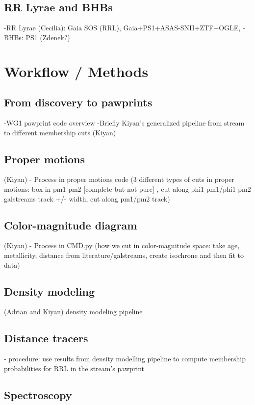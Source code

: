 \documentclass[twocolumn]{aastex63}
\begin{document}
\subsection{RR Lyrae and BHBs}

-RR Lyrae (Cecilia): Gaia SOS (RRL), Gaia+PS1+ASAS-SNII+ZTF+OGLE,  
-BHBs: PS1 (Zdenek?)

\section{Workflow / Methods}

\subsection{From discovery to pawprints}

-WG1 pawprint code overview
-Briefly Kiyan's generalized pipeline from stream to different membership cuts (Kiyan)

\subsection{Proper motions}
(Kiyan)
- Process in proper motions code (3 different types of cuts in proper motions: box in pm1-pm2 [complete but not pure] , cut along phi1-pm1/phi1-pm2 galstreams track +/- width, cut along pm1/pm2 track)

\subsection{Color-magnitude diagram}
(Kiyan)
- Process in CMD.py (how we cut in color-magnitude space: take age, metallicity, distance from literature/galstreams, create isochrone and then fit to data)

\subsection{Density modeling}

(Adrian and Kiyan) density modeling pipeline

\subsection{Distance tracers}

- procedure: use results from density modelling pipeline to compute membership probabilities for RRL in the stream's pawprint 

\subsection{Spectroscopy}
\end{document}
